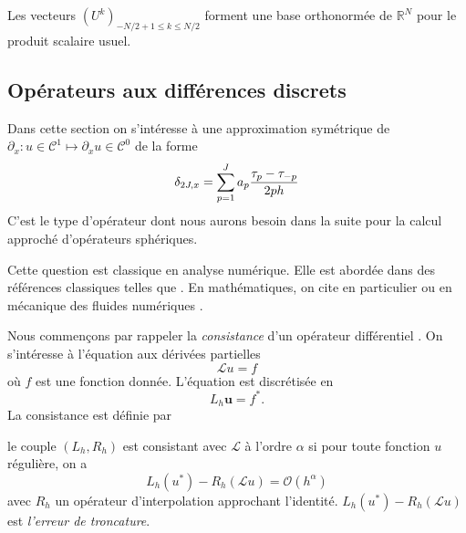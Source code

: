 Les vecteurs $(U^k)_{-N/2+1 \leq k \leq N/2}$ forment une base orthonormée de $\mathbb{R}^N$ pour le produit scalaire usuel.



















\subsection{Opérateurs aux différences discrets}

Dans cette section on s'intéresse à une approximation symétrique de $\partial_x : u \in \mathcal{C}^1 \mapsto \partial_x u \in \mathcal{C}^0$ de la forme
\begin{equation}
\delta_{2J,x} = \displaystyle\sum\limits_{p=1}^J a_p \dfrac{\tau_p - \tau_{-p}}{2 p h}
\label{eq:explicite_dx}
\end{equation}
C'est le type d'opérateur dont nous aurons besoin dans la suite pour la calcul approché d'opérateurs sphériques.

Cette question est classique en analyse numérique. Elle est abordée dans des références classiques telles que \cite{Ames2014, Collatz2012, Kopal1955}. En mathématiques, on cite en particulier \cite{Collatz2012, Kopal1955} ou en mécanique des fluides numériques \cite{Hirsch2007}.

Nous commençons par rappeler la \textit{consistance} d'un opérateur différentiel \cite{Strikwerda2004}. On s’intéresse à l'équation aux dérivées partielles
\begin{equation}
\mathcal{L}u = f
\end{equation}
où $f$ est une fonction donnée. L'équation est discrétisée en
\begin{equation}
L_h \mathbf{u} = f^* .
\end{equation}
La consistance est définie par
\begin{definition}
le couple $(L_h, R_h)$ est consistant avec $\mathcal{L}$ à l'ordre $\alpha$ si pour toute fonction $u$ régulière, on a
\begin{equation}
L_h (u^*) -R_h \left( \mathcal{L}u \right) = \mathcal{O}(h^{\alpha})
\end{equation}
avec $R_h$ un opérateur d'interpolation approchant l'identité. $L_h (u^*) -R_h \left( \mathcal{L}u \right)$ est \textit{l'erreur de troncature}.
\label{def:consistance}
\end{definition}


